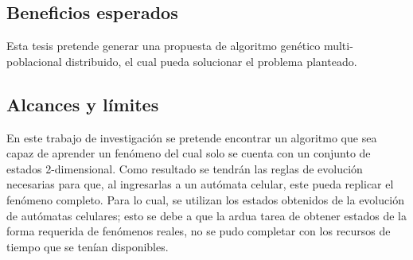 \subsection{Beneficios esperados}
Esta tesis pretende generar una propuesta de algoritmo genético multi-poblacional distribuido, el cual pueda solucionar el problema planteado.

\subsection{Alcances y límites}
En este trabajo de investigación se pretende encontrar un algoritmo que sea capaz de aprender un fenómeno del cual solo se cuenta con un conjunto de estados 2-dimensional. Como resultado se tendrán las reglas de evolución necesarias para que, al ingresarlas a un autómata celular, este pueda replicar el fenómeno completo. Para lo cual, se utilizan los estados obtenidos de la evolución de autómatas celulares; esto se debe a que la ardua tarea de obtener estados de la forma requerida de fenómenos reales, no se pudo completar con los recursos de tiempo que se tenían disponibles.

\